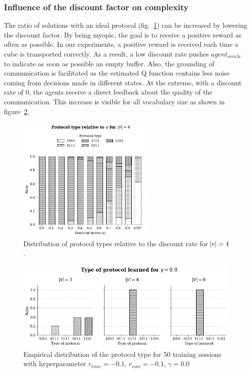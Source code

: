 \subsubsection*{Influence of the discount factor on complexity}

The ratio of solutions with an ideal protocol (fig.~\ref{fig:exp-2-disc}) can be increased by lowering the discount factor. By being myopic, the goal is to receive a positive reward as often as possible. In our experiments, a positive reward is received each time a cube is transported correctly. As a result, a low discount rate pushes $agent_{arm3c}$ to indicate as soon as possible an empty buffer. Also, the grounding of communication is facilitated as the estimated Q function contains less noise coming from decisions made in different states. At the extreme, with a discount rate of 0, the agents receive a direct feedback about the quality of the communication. This increase is visible for all vocabulary size as shown in figure~\ref{fig:exp-2-disc-best}.


\begin{figure}[ht]
\centering
\includegraphics[width=0.6\textwidth]{imgs/exp-2-complexity-4msgs-discount.png}
\caption[Empirical distribution of protocol types relative to the discount rate]{Distribution of protocol types relative to the discount rate for $\abs{v}=4$.}
\label{fig:exp-2-disc}
\end{figure}

\begin{figure}[ht]
\centering
\includegraphics[width=\textwidth]{imgs/exp-2-complexity-best-comparison.png}
\caption[Empirical distribution of protocol types (best parameters)]{Empirical distribution of the protocol type for 50 training sessions with hyperparameter $r_{time}=-0.1$, $r_{com}=-0.1$, $\gamma=0.0$}
\label{fig:exp-2-disc-best}
\end{figure}

